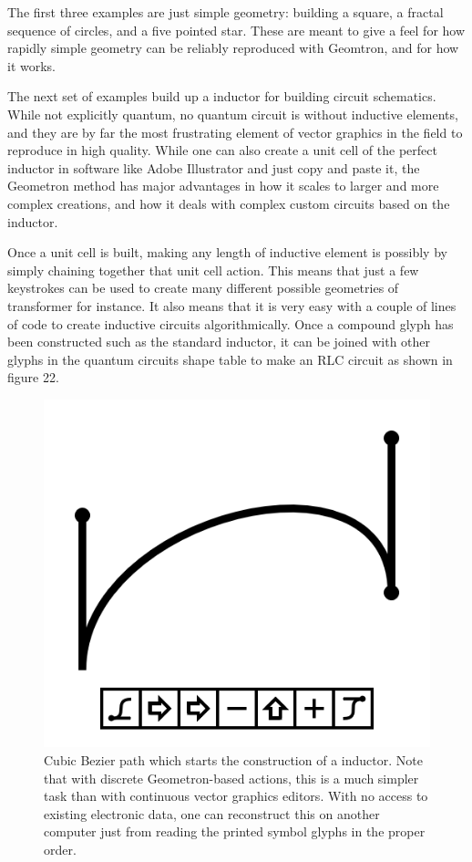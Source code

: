 \documentclass[11pt]{article}
\begin{document}
    The first three examples are just simple geometry: building a square, a fractal sequence of circles, and a five pointed star.  These are meant to give a feel for how rapidly simple geometry can be reliably reproduced with Geomtron, and for how it works.  




    The next set of examples build up a inductor for building circuit schematics.  While not explicitly quantum, no quantum circuit is without inductive elements, and they are by far the most frustrating element of vector graphics in the field to reproduce in high quality.  While one can also create a unit cell of the perfect inductor in software like Adobe Illustrator and just copy and paste it, the Geometron method has major advantages in how it scales to larger and more complex creations, and how it deals with complex custom circuits based on the inductor.   




    Once a unit cell is built, making any length of inductive element is possibly by simply chaining together that unit cell action.  This means that just a few keystrokes can be used to create many different possible geometries of transformer for instance.  It also means that it is very easy with a couple of lines of code to create inductive circuits algorithmically. Once a compound glyph has been constructed such as the standard inductor, it can be joined with other glyphs in the quantum circuits shape table to make an RLC circuit as shown in figure 22.  


\begin{figure}

\includegraphics[width=\linewidth]{figures/figure18_coilBezier1.png}

\caption{Cubic Bezier path which starts the construction of a inductor.  Note that with discrete Geometron-based actions, this is a much simpler task than with continuous vector graphics editors.  With no access to existing electronic data, one can reconstruct this on another computer just from reading the printed symbol glyphs in the proper order.}
\end{figure}
\end{document}
